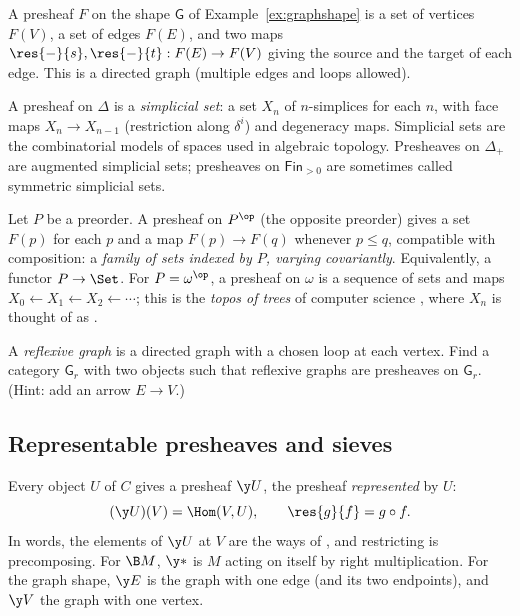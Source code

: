 \begin{example}\label{ex:graphs}
A presheaf $F$ on the shape $\mathsf G$ of Example~\ref{ex:graphshape} is a set of vertices $F(V)$, a set of edges $F(E)$, and two maps $\res{-}{s},\res{-}{t} : F(E)\to F(V)$ giving the source and the target of each edge. This is a directed graph (multiple edges and loops allowed).
\end{example}

\begin{example}
A presheaf on $\Delta$ is a \emph{simplicial set}: a set $X_n$ of $n$-simplices for each $n$, with face maps $X_n\to X_{n-1}$ (restriction along $\delta^i$) and degeneracy maps. Simplicial sets are the combinatorial models of spaces used in algebraic topology. Presheaves on $\Delta_+$ are augmented simplicial sets; presheaves on $\mathsf{Fin}_{>0}$ are sometimes called symmetric simplicial sets.
\end{example}

\begin{example}\label{ex:preorderpsh}
Let $P$ be a preorder. A presheaf on $P^{\op}$ (the opposite preorder) gives a set $F(p)$ for each $p$ and a map $F(p)\to F(q)$ whenever $p\le q$, compatible with composition: a \emph{family of sets indexed by $P$, varying covariantly}. Equivalently, a functor $P\to\Set$. For $P = \omega^{\op}$, a presheaf on $\omega$ is a sequence of sets and maps $X_0\leftarrow X_1\leftarrow X_2\leftarrow\cdots$; this is the \emph{topos of trees} of computer science \cite{birkedal}, where $X_n$ is thought of as .
\end{example}

\begin{exercise}\label{exo:reflgraph}
A \emph{reflexive graph} is a directed graph with a chosen loop at each vertex. Find a category $\mathsf G_r$ with two objects such that reflexive graphs are presheaves on $\mathsf G_r$. (Hint: add an arrow $E\to V$.)
\end{exercise}

\subsection{Representable presheaves and sieves}

Every object $U$ of $C$ gives a presheaf $\y U$, the presheaf \emph{represented} by $U$:
\[
(\y U)(V) = \Hom(V,U),\qquad \res{g}{f} = g\circ f.
\]
In words, the elements of $\y U$ at $V$ are the ways of , and restricting is precomposing. For $\B M$, $\y\ast$ is $M$ acting on itself by right multiplication. For the graph shape, $\y E$ is the graph with one edge (and its two endpoints), and $\y V$ the graph with one vertex.

